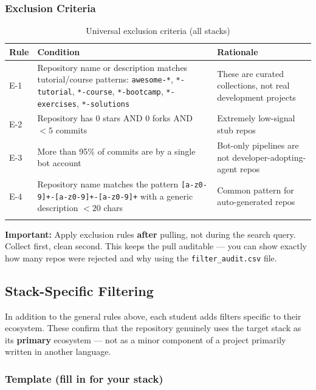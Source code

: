 \documentclass[11pt,a4paper]{article}
\begin{document}
\subsubsection{Exclusion Criteria}

\begin{longtable}{lp{8cm}p{4.5cm}}
\toprule
\textbf{Rule} & \textbf{Condition} & \textbf{Rationale} \\
\midrule
\endhead
E-1 & Repository name or description matches tutorial/course patterns: \texttt{awesome-*}, \texttt{*-tutorial}, \texttt{*-course}, \texttt{*-bootcamp}, \texttt{*-exercises}, \texttt{*-solutions} & These are curated collections, not real development projects \\
E-2 & Repository has 0 stars AND 0 forks AND $<5$ commits & Extremely low-signal stub repos \\
E-3 & More than 95\% of commits are by a single bot account & Bot-only pipelines are not developer-adopting-agent repos \\
E-4 & Repository name matches the pattern \texttt{[a-z0-9]+-[a-z0-9]+-[a-z0-9]+} with a generic description $<20$ chars & Common pattern for auto-generated repos \\
\bottomrule
\caption{Universal exclusion criteria (all stacks)}
\end{longtable}

\begin{warnbox}
\textbf{Important:} Apply exclusion rules \textbf{after} pulling, not during the search query. Collect first, clean second. This keeps the pull auditable — you can show exactly how many repos were rejected and why using the \texttt{filter\_audit.csv} file.
\end{warnbox}

\subsection{Stack-Specific Filtering}

In addition to the general rules above, each student adds filters specific to their ecosystem. These confirm that the repository genuinely uses the target stack as its \textbf{primary} ecosystem — not as a minor component of a project primarily written in another language.

\subsubsection{Template (fill in for your stack)}
\end{document}
